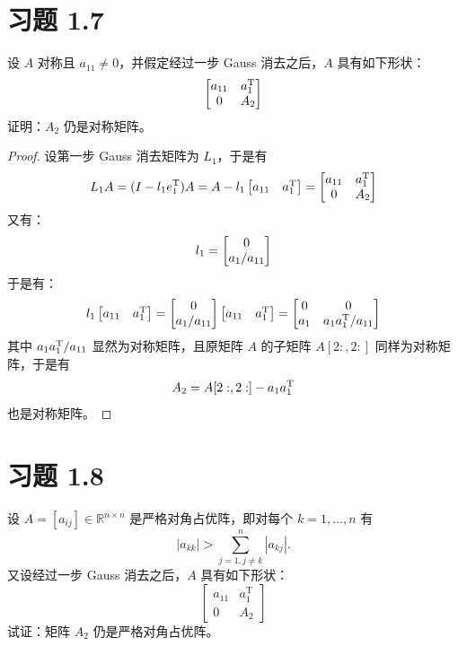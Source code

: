 \documentclass{article}
\begin{document}
\section{习题 1.7}
设 $A$ 对称且 $a_{11}\neq 0$，并假定经过一步 Gauss 消去之后，$A$ 具有如下形状：
\[
  \begin{bmatrix}
    a_{11} & a_1^{\mathrm{T}} \\
    0 & A_2
  \end{bmatrix}
\]
证明：$A_2$ 仍是对称矩阵。

\begin{proof}
  设第一步 Gauss 消去矩阵为 $L_1$，于是有
  \[
    L_1 A = (I - l_1 e_1^{\mathrm{T}}) A = A - l_1
    \begin{bmatrix}
      a_{11} & a_{1}^{\mathrm{T}}
    \end{bmatrix} =
    \begin{bmatrix}
      a_{11} & a_1^{\mathrm{T}} \\
      0 & A_2
    \end{bmatrix}
  \]
  又有：
  \[
    l_1 = \begin{bmatrix} 0 \\ a_1 / a_{11} \end{bmatrix}
  \]
  于是有：
  \[
    l_1 \begin{bmatrix} a_{11} & a_1^{\mathrm{T}} \end{bmatrix}
    = \begin{bmatrix} 0 \\ a_1 / a_{11} \end{bmatrix} \begin{bmatrix} a_{11} & a_1^{\mathrm{T}} \end{bmatrix} =
    \begin{bmatrix}
      0 & 0 \\
      a_1 & a_1 a_1^{\mathrm{T}} / a_{11}
    \end{bmatrix}
  \]
  其中 $a_1 a_1^{\mathrm{T}} / a_{11}$ 显然为对称矩阵，且原矩阵 $A$ 的子矩阵 $A[2:,2:]$ 同样为对称矩阵，于是有
  \[
    A_2 = A[2:,2:] - a_1 a_1^{\mathrm{T}}
  \]
  也是对称矩阵。

\end{proof}

\section{习题 1.8}
设 $A=[a_{ij}]\in\mathbb{R}^{n\times n}$ 是严格对角占优阵，即对每个 $k=1,\dots,n$ 有
\[
  |a_{kk}|>\sum_{j=1,j\neq k}^n |a_{kj}|.
\]
又设经过一步 Gauss 消去之后，$A$ 具有如下形状：
\[
  \begin{bmatrix}
    a_{11} & a_1^{\mathrm{T}} \\
    0 & A_2
  \end{bmatrix}
\]
试证：矩阵 $A_2$ 仍是严格对角占优阵。
\end{document}
